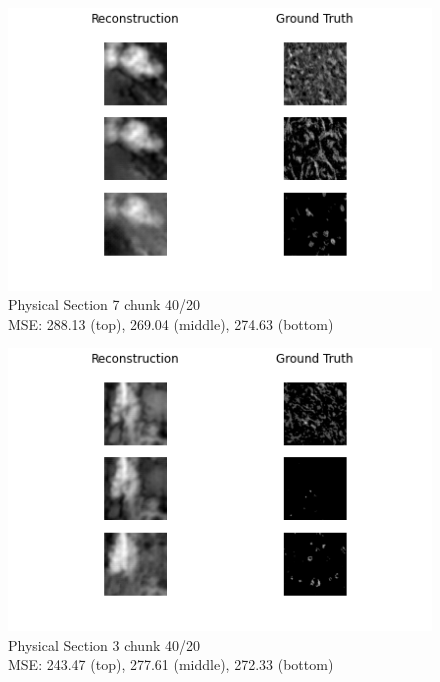 \documentclass[10pt,twocolumn,letterpaper]{article}
\begin{document}
\newpage 
\begin{figure}
	\centering
	\captionsetup{justification=centering}
		\hspace*{-0.8cm}	
		\includegraphics[scale=0.60]{../figures/7_40_20.png}
	\caption{Physical Section 7 chunk 40/20\\ MSE: 288.13 (top), 269.04 (middle), 274.63 (bottom)}		
\end{figure}


\begin{figure}
	\centering
	\captionsetup{justification=centering}
		\hspace*{-0.8cm}	
		\includegraphics[scale=0.60]{../figures/3_40_20.png}
	\caption{Physical Section 3 chunk 40/20\\ MSE: 243.47 (top), 277.61 (middle), 272.33 (bottom)}		
\end{figure}
\end{document}
